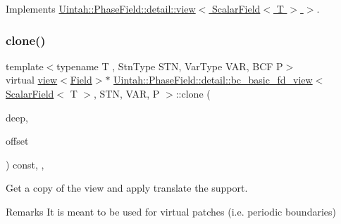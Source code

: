 Implements \hyperlink{classUintah_1_1PhaseField_1_1detail_1_1view_3_01ScalarField_3_01T_01_4_01_4_a6e11243c9d776a7b703e524ea4151a16}{Uintah\+::\+Phase\+Field\+::detail\+::view$<$ Scalar\+Field$<$ T $>$ $>$}.

\mbox{\label{classUintah_1_1PhaseField_1_1detail_1_1bc__basic__fd__view_3_01ScalarField_3_01T_01_4_00_01STN_00_01VAR_00_01P_01_4_adc6935173c04499a5a7c769d296a97d7}} 
\subsubsection{\texorpdfstring{clone()}{clone()}\hspace{0.1cm}{\footnotesize\ttfamily [2/2]}}
{\footnotesize\ttfamily template$<$typename T , Stn\+Type S\+TN, Var\+Type V\+AR, B\+CF P$>$ \\
virtual \hyperlink{classUintah_1_1PhaseField_1_1detail_1_1view}{view}$<$\hyperlink{structUintah_1_1PhaseField_1_1ScalarField}{Field}$>$$\ast$ \hyperlink{classUintah_1_1PhaseField_1_1detail_1_1bc__basic__fd__view}{Uintah\+::\+Phase\+Field\+::detail\+::bc\+\_\+basic\+\_\+fd\+\_\+view}$<$ \hyperlink{structUintah_1_1PhaseField_1_1ScalarField}{Scalar\+Field}$<$ T $>$, S\+TN, V\+AR, P $>$\+::clone (\begin{DoxyParamCaption}\item[{bool}]{deep,  }\item[{const Int\+Vector \&}]{offset }\end{DoxyParamCaption}) const\hspace{0.3cm}{\ttfamily [inline]}, {\ttfamily [override]}, {\ttfamily [virtual]}}



Get a copy of the view and apply translate the support. 

\begin{DoxyRemark}{Remarks}
It is meant to be used for virtual patches (i.\+e. periodic boundaries)
\end{DoxyRemark}

